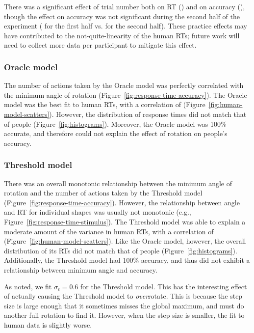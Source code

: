 \documentclass[10pt,letterpaper]{article}
\newcommand{\Oc}[0]{Oracle}
\newcommand{\Th}[0]{Threshold}
\begin{document}
There was a significant effect of trial number both on RT
(\ExpTrialTimeCorr{}) and on accuracy (\ExpTrialAccuracyCorr{}),
though the effect on accuracy was not significant during the second
half of the experiment (\ExpaTrialAccuracyCorr{} for the first half
vs. \ExpbTrialAccuracyCorr{} for the second half). These practice
effects may have contributed to the not-quite-linearity of the human
RTs; future work will need to collect more data per participant to
mitigate this effect.

\subsubsection{\Oc{} model}

The number of actions taken by the \Oc{} model was perfectly
correlated with the minimum angle of rotation
(Figure~\ref{fig:response-time-accuracy}). The \Oc{} model was the
best fit to human RTs, with a correlation of \OcTimeCorr{}
(Figure~\ref{fig:human-model-scatters}).  However, the distribution of
response times did not match that of people
(Figure~\ref{fig:histograms}). Moreover, the \Oc{} model was 100\%
accurate, and therefore could not explain the effect of rotation on
people's accuracy.

\subsubsection{\Th{} model}

There was an overall monotonic relationship between the minimum angle
of rotation and the number of actions taken by the \Th{} model
(Figure~\ref{fig:response-time-accuracy}). However, the relationship
between angle and RT for individual shapes was usually not monotonic
(e.g., Figure~\ref{fig:response-time-stimulus}).  The \Th{} model was
able to explain a moderate amount of the variance in human RTs, with a
correlation of \ThTimeCorr{}
(Figure~\ref{fig:human-model-scatters}). Like the \Oc{} model,
however, the overall distribution of its RTs did not match that of
people (Figure~\ref{fig:histograms}). Additionally, the \Th{} model
had 100\% accuracy, and thus did not exhibit a relationship between
minimum angle and accuracy.

As noted, we fit $\sigma_\epsilon=0.6$ for the \Th{} model. This has
the interesting effect of actually causing the \Th{} model to
\textit{over}rotate. This is because the step size is large enough
that it sometimes misses the global maximum, and must do another full
rotation to find it. However, when the step size is smaller, the fit
to human data is slightly worse.
\end{document}
